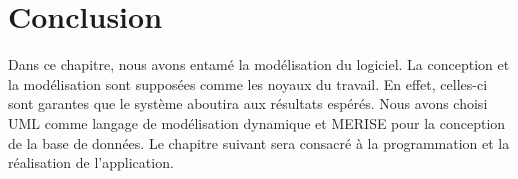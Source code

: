 \section{Conclusion}
Dans ce chapitre, nous avons entamé la modélisation du logiciel. La conception et la modélisation sont supposées comme les noyaux du travail. En effet, celles-ci sont garantes que le système aboutira aux résultats espérés. Nous avons choisi UML comme langage de modélisation dynamique et MERISE pour la conception de la base de données. Le chapitre
suivant sera consacré à la programmation et la réalisation de l'application.